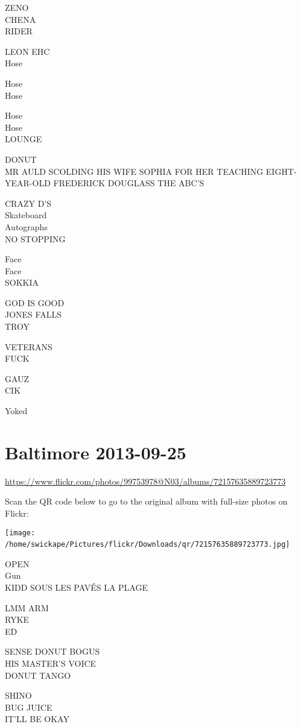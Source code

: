 \documentclass[10pt,letterpaper]{article}
\begin{document}
ZENO\\
CHENA\\
RIDER

LEON EHC\\
Hose

Hose\\
Hose

Hose\\
Hose\\
LOUNGE

DONUT\\
MR AULD SCOLDING HIS WIFE SOPHIA FOR HER TEACHING EIGHT{-}YEAR{-}OLD FREDERICK DOUGLASS THE ABC'S

CRAZY D'S\\
Skateboard\\
Autographs\\
NO STOPPING

Face\\
Face\\
SOKKIA

GOD IS GOOD\\
JONES FALLS\\
TROY

VETERANS\\
FUCK

GAUZ\\
CIK

Yoked
\

\section*{Baltimore 2013-09-25}

\url{https://www.flickr.com/photos/99753978@N03/albums/72157635889723773}

Scan the QR code below to go to the original album with full-size photos on Flickr:

\texttt{[image: /home/swickape/Pictures/flickr/Downloads/qr/72157635889723773.jpg]}
\

OPEN\\
Gun\\
KIDD SOUS LES PAVÉS LA PLAGE

LMM ARM\\
RYKE\\
ED

SENSE DONUT BOGUS\\
HIS MASTER'S VOICE\\
DONUT TANGO

SHINO\\
BUG JUICE\\
IT'LL BE OKAY
\end{document}
